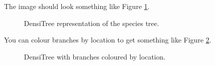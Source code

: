 \documentclass{article}
\begin{document}
The image should look something like Figure \ref{fig.DensiTree}.

\begin{figure}
\begin{center}
\end{center}
\caption{\label{fig.DensiTree} DensiTree representation of the species tree.}
\end{figure}

You can colour branches by location to get something like Figure \ref{fig.DensiTree2}.

\begin{figure}
\begin{center}
\end{center}
\caption{\label{fig.DensiTree2} DensiTree with branches coloured by location.}
\end{figure}
\end{document}
